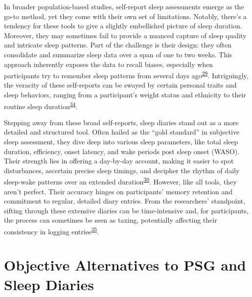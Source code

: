 \documentclass[
  9pt,
]{scrbook}
\begin{document}
In broader population-based studies, self-report sleep assessments
emerge as the go-to method, yet they come with their own set of
limitations. Notably, there's a tendency for these tools to give a
slightly embellished picture of sleep duration. Moreover, they may
sometimes fail to provide a nuanced capture of sleep quality and
intricate sleep patterns. Part of the challenge is their design: they
often consolidate and summarize sleep data over a span of one to two
weeks. This approach inherently exposes the data to recall biases,
especially when participants try to remember sleep patterns from several
days ago\textsuperscript{\protect\hyperlink{ref-sadeh_2015}{29}}.
Intriguingly, the veracity of these self-reports can be swayed by
certain personal traits and sleep behaviors, ranging from a
participant's weight status and ethnicity to their routine sleep
duration\textsuperscript{\protect\hyperlink{ref-lauderdale_2008}{34}}.

Stepping away from these broad self-reports, sleep diaries stand out as
a more detailed and structured tool. Often hailed as the ``gold
standard'' in subjective sleep assessment, they dive deep into various
sleep parameters, like total sleep duration, efficiency, onset latency,
and wake periods post sleep onset (WASO). Their strength lies in
offering a day-by-day account, making it easier to spot disturbances,
ascertain precise sleep timings, and decipher the rhythm of daily
sleep-wake patterns over an extended
duration\textsuperscript{\protect\hyperlink{ref-ibuxe1uxf1ez_2018}{30}}.
However, like all tools, they aren't perfect. Their accuracy hinges on
participants' memory retention and commitment to regular, detailed diary
entries. From the researchers' standpoint, sifting through these
extensive diaries can be time-intensive and, for participants, the
process can sometimes be seen as taxing, potentially affecting their
consistency in logging
entries\textsuperscript{\protect\hyperlink{ref-thurman_2018}{35}}.

\hypertarget{objective-alternatives-to-psg-and-sleep-diaries}{%
\section{Objective Alternatives to PSG and Sleep
Diaries}\label{objective-alternatives-to-psg-and-sleep-diaries}}
\end{document}
